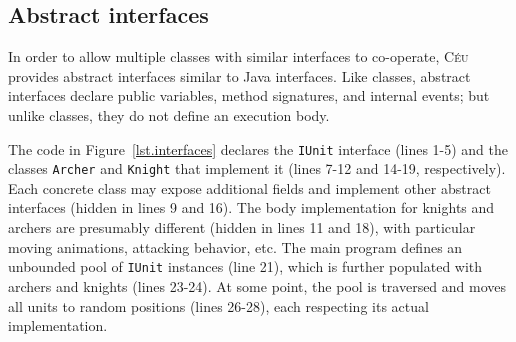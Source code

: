 \documentclass{sigplanconf}
\newcommand{\CEU}{\textsc{C\'{e}u}\xspace}
\newcommand{\code}[1] {{\small{\texttt{#1}}}}
\newcommand{\1}{\;}
\newcommand{\2}{\;\;}
\newcommand{\3}{\;\;\;}
\newcommand{\5}{\;\;\;\;\;}
\begin{document}

\subsection{Abstract interfaces}

In order to allow multiple classes with similar interfaces to co-operate, \CEU 
provides abstract interfaces similar to Java interfaces.
%
Like classes, abstract interfaces declare public variables, method signatures, 
and internal events; but unlike classes, they do not define an execution body.

The code in Figure~\ref{lst.interfaces} declares the \code{IUnit} interface 
(lines 1-5) and the classes \code{Archer} and \code{Knight} that implement it 
(lines 7-12 and 14-19, respectively).
%
Each concrete class may expose additional fields and implement other abstract 
interfaces (hidden in lines 9 and 16).
%
The body implementation for knights and archers are presumably different 
(hidden in lines 11 and 18), with particular moving animations, attacking 
behavior, etc.
%
The main program defines an unbounded pool of \code{IUnit} instances (line 21), 
which is further populated with archers and knights (lines 23-24).
At some point, the pool is traversed and moves all units to random positions 
(lines 26-28), each respecting its actual implementation.
\end{document}
